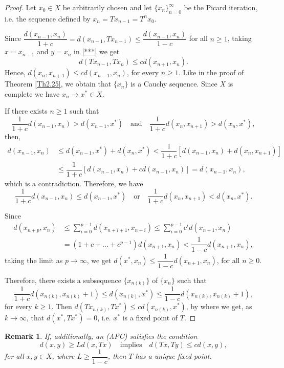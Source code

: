 \documentclass[12 pt]{article}
\theoremstyle{lema}
\theoremstyle{proposition}
\theoremstyle{theorem}
\theoremstyle{theorem}
\newtheorem{remark}{Remark}[section]
\theoremstyle{corollary}
\theoremstyle{definition}
\theoremstyle{example}
\begin{document}
	\begin{proof}
		Let \(x_0 \in X\) be arbitrarily chosen and let \(\{x_n\}_{n=0}^{\infty}\) be the Picard iteration, i.e. the sequence defined by \(x_n = Tx_{n-1} = T^nx_0\). 
		
		Since \(\dfrac{d(x_{n-1},x_n)}{1+c} = d(x_{n-1}, Tx_{n-1}) \leq \dfrac{d(x_{n-1},x_n)}{1-c}\) for all \(n \geq 1\), taking \(x=x_{n-1}\) and \(y=x_n\) in \ref{***} we get 
		\[d(Tx_{n-1},Tx_n) \leq c d(x_{n+1},x_n).\]
		Hence, \(d(x_n,x_{n+1}) \leq c d(x_{n-1},x_n)\), for every \(n \geq 1\). Like in the proof of Theorem \ref{Th2.25}, we obtain that \(\{x_n\}\) is a Cauchy sequence. Since \(X\) is complete we have \(x_n \to x^* \in X\).
		
		If there exists \(n\geq 1\) such that 
		\[\dfrac1{1+c}d(x_{n-1},x_n) > d(x_{n-1},x^*) \quad \text{and} \quad \dfrac1{1+c}d(x_{n},x_{n+1}) > d(x_{n},x^*),\]
		then,
		\begin{align*}
			d(x_{n-1},x_n) &\leq d(x_{n-1},x^*)+d(x_{n},x^*) < \dfrac1{1+c}[d(x_{n-1},x_n)+d(x_{n},x_{n+1})]\\
			&\leq \dfrac1{1+c}[d(x_{n-1},x_n)+cd(x_{n-1},x_n)] = d(x_{n-1},x_n),
		\end{align*}
		which is a contradiction. Therefore, we have
		\[\dfrac{1}{1+c}d(x_{n-1},x_n) \leq d(x_{n-1},x^*) \quad\text{or} \quad \dfrac1{1+c}d(x_{n},x_{n+1})< d(x_{n},x^*).\]
		
		Since 
		\begin{align*}
			d(x_{n+p}, x_{n}) &\leq \sum_{i=0}^{p-1} d(x_{n+i+1},x_{n+i}) \leq \sum_{i=0}^{p-1} c^{i} d(x_{n+1},x_{n})\\
			& =(1+c+\dots+c^{p-1}) d(x_{n+1},x_{n}) < \dfrac{1}{1-c} d(x_{n+1},x_{n}),
		\end{align*}
		taking the limit as \(p \to \infty\), we get \(d(x^*,x_n) \leq \dfrac{1}{1-c} d(x_{n+1},x_n)\), for all \(n \geq 0\).
		
		Therefore, there exists a subsequence \(\{x_{n(k)}\}\) of \(\{x_n\}\) such that 
		\[\dfrac1{1+c}d(x_{n(k)},x_{n(k)}+1) \leq d(x_{n(k)},x^*) \leq \dfrac{1}{1-c}d(x_{n(k)},x_{n(k)}+1),\]
		for every \(k \geq 1\). Then \(d(Tx_{n(k)},Tx^*) \leq c d(x_{n(k)},x^*)\), by where we get, as \(k\to \infty\), that \(d(x^*, Tx^*) = 0\), i.e. \(x^*\) is a fixed point of \(T\).
	\end{proof}

	\begin{remark}
		If, additionally, an (APC) satisfies the condition
		\[d(x,y) \geq L d(x,Tx) \quad \text{implies} \quad d(Tx,Ty) \leq c d(x,y),\]
		for all \(x,y \in X\), where \(L \geq \dfrac{1}{1-c}\), then \(T\) has a unique fixed point.
	\end{remark}
	
\end{document}
